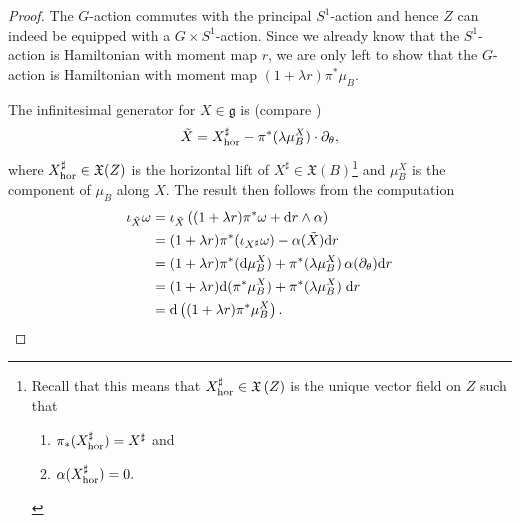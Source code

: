 \documentclass[10pt,oneside,reqno]{amsart}
\theoremstyle{definition}
\renewcommand{\dd}{\textup{d}}
\newcommand{\fg}{\mathfrak{g}}
\newcommand{\vf}[1]{\mathfrak{X}\left( #1 \right)}
\newcommand{\hor}{\textup{hor}}
\begin{document}
\begin{proof}
    The $G$-action commutes with the principal $S^1$-action and hence $Z$ can indeed be equipped with a $G\times S^1$-action. Since we already know that the $S^1$-action is Hamiltonian with moment map $r$, we are only left to show that the $G$-action is Hamiltonian with moment map $(1+\lambda r)\pi^*\mu_B$. 
    
    The infinitesimal generator for $X\in \fg$ is (compare \cite[Example 6.10]{guillemin2002moment})
\begin{equation*}
    \Tilde{X} =X^\sharp_\textup{hor} -  \pi^*(\lambda \mu_B^X) \cdot \partial_\theta,
\end{equation*}
where $X^\sharp_\hor\in \mathfrak{X}(Z)$ is the horizontal lift of $X^\sharp\in \mathfrak{X}(B)$\footnote{Recall that this means that $X_\hor^\sharp\in \vf{Z}$ is the unique vector field on $Z$ such that \begin{enumerate}
    \item $\pi_*(X^\sharp_\hor)=X^\sharp$ and
    \item $\alpha(X^\sharp_\hor)=0.$
\end{enumerate}} and $\mu_B^X$ is the component of $\mu_B$ along $X$. The result then follows from the computation
\begin{align*}
    \iota_{\Tilde{X}} \omega &= \iota_{\Tilde{X}}\left( (1+\lambda r)\pi^*\omega+ \dd r\wedge \alpha\right) \\
    &= (1+\lambda r)\pi^*(\iota_{X^\sharp}\omega) - \alpha(\Tilde{X}) \dd r \\
    &= (1+ \lambda r) \pi^*(\dd \mu_B^X)  + \pi^*(\lambda \mu_B^X) \,\alpha(\partial_\theta) \dd r \\
    &= (1+\lambda r) \dd (\pi^* \mu_B^X) + \pi^*(\lambda \mu_B^X) \;\dd r \\
    &= \dd \left( (1+\lambda r)\pi^*\mu_B^X\right). \qedhere
\end{align*}
\end{proof}
\end{document}
